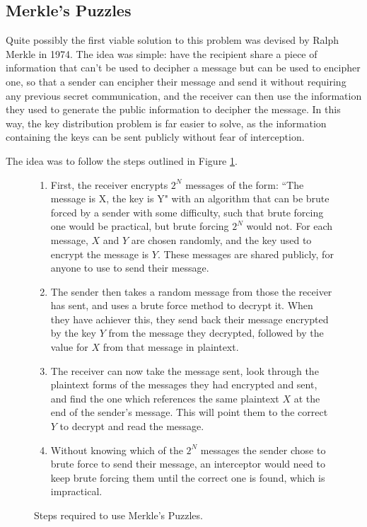 \documentclass[a4paper,12pt]{report}
\begin{document}
    \subsection{Merkle's Puzzles}
Quite possibly the first viable solution to this problem was devised by Ralph
Merkle in 1974\cite{merkle}. The idea was simple: have the recipient share a
piece of information that can't be used to decipher a message but can be used to
encipher one, so that a sender can encipher their message and send it without
requiring any previous secret communication, and the receiver can then use the
information they used to generate the public information to decipher the
message. In this way, the key distribution problem is far easier to solve, as
the information containing the keys can be sent publicly without fear of
interception.

The idea was to follow the steps outlined in Figure \ref{fig:merklepuzzle}.

    \begin{figure}[h!]
      \begin{enumerate}
\item First, the receiver encrypts \(2^N\) messages of the form: ``The message
is X, the key is Y" with an algorithm that can be brute forced by a sender with
some difficulty, such that brute forcing one would be practical, but brute
forcing \(2^N\) would not. For each message, \(X\) and \(Y\) are chosen
randomly, and the key used to encrypt the message is \(Y\). These messages are
shared publicly, for anyone to use to send their message.
\item The sender then takes a random message from those the receiver has sent,
and uses a brute force method to decrypt it. When they have achiever this, they
send back their message encrypted by the key \(Y\) from the message they
decrypted, followed by the value for \(X\) from that message in plaintext.
\item The receiver can now take the message sent, look through the plaintext
forms of the messages they had encrypted and sent, and find the one which
references the same plaintext \(X\) at the end of the sender's message. This
will point them to the correct \(Y\) to decrypt and read the message.
\item Without knowing which of the \(2^N\) messages the sender chose to brute
force to send their message, an interceptor would need to keep brute forcing
them until the correct one is found, which is impractical.
      \end{enumerate}
      \caption{Steps required to use Merkle's Puzzles.}
      \label{fig:merklepuzzle}
    \end{figure}
\end{document}
